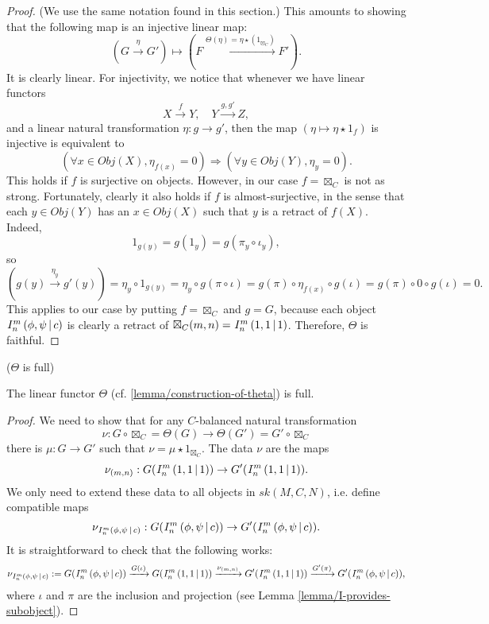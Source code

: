 \begin{proof}
  (We use the same notation found in this section.) This amounts to showing
  that the following map is an injective linear map:
  \[
    (G \xrightarrow{\eta} G') \mapsto (F \xrightarrow{\Theta(\eta) = \eta \star (1_{\boxtimes_{C}})} F').
  \]
  It is clearly linear. For injectivity, we notice that whenever we have
  linear functors
  \[
    X \xrightarrow{f} Y,\quad Y \xrightarrow{g, g'} Z,
  \]
  and a linear natural transformation $\eta: g \to g'$, then the map $(\eta \mapsto \eta \star 1_{f})$ is injective is equivalent to
  \[
    (\forall x \in Obj(X), \eta_{f(x)} = 0) \Rightarrow (\forall y \in Obj(Y), \eta_{y} = 0).
  \]
  This holds if $f$ is surjective on objects. However, in our case
  $f = \boxtimes_{C}$ is not as strong. Fortunately, clearly it also holds if
  $f$ is almost-surjective, in the sense that each $y \in Obj(Y)$ has an
  $x \in Obj(X)$ such that $y$ is a retract of $f(X)$. Indeed,
  \[
    1_{g(y)} = g(1_{y}) = g(\pi_{y} \circ \iota_{y}),
  \]
  so
  \[
    (g(y) \xrightarrow{\eta_{y}} g'(y)) = \eta_{y} \circ 1_{g(y)} = \eta_{y} \circ g(\pi \circ \iota) = g(\pi) \circ \eta_{f(x)} \circ g(\iota) = g(\pi) \circ 0 \circ g(\iota) = 0.
  \]
  This applies to our case by putting $f = \boxtimes_{C}$ and $g = G$, because
  each object ${}^{}_{} I^{m}_{n} \left( \phi, \psi \,\middle|\, c \right)$ is clearly a retract of
  $\boxtimes_{C}(m,n) = {}^{}_{} I^{m}_{n} \left( 1, 1 \,\middle|\, 1 \right)$. Therefore, $\Theta$ is faithful.
\end{proof}

\begin{lemma}\label{lemma/theta-is-full} ($\Theta$ is full)

  \noindent The linear functor $\Theta$ (cf. \ref{lemma/construction-of-theta}) is full.
\end{lemma}

\begin{proof}
  We need to show that for any $C$-balanced natural transformation
  \[
    \nu: G \circ \boxtimes_{C} = \Theta(G) \to \Theta(G') = G' \circ \boxtimes_{C}
  \]
  there is $\mu: G \to G'$ such that $\nu = \mu \star 1_{\boxtimes_{C}}$. The data $\nu$ are the maps
  \[
    \nu_{(m,n)}: G({}^{}_{} I^{m}_{n} \left( 1, 1 \,\middle|\, 1 \right)) \to G'({}^{}_{} I^{m}_{n} \left( 1, 1 \,\middle|\, 1 \right)).
  \]
  We only need to extend these data to all objects in $sk(M,C,N)$, i.e. define compatible maps
  \[
    \nu_{{}^{}_{} I^{m}_{n} \left( \phi, \psi \,\middle|\, c \right)}: G({}^{}_{} I^{m}_{n} \left( \phi, \psi \,\middle|\, c \right)) \to G'({}^{}_{} I^{m}_{n} \left( \phi, \psi \,\middle|\, c \right)).
  \]
  It is straightforward to check that the following works:
  \[
    \nu_{{}^{}_{} I^{m}_{n} \left( \phi, \psi \,\middle|\, c \right)}:= G({}^{}_{} I^{m}_{n} \left( \phi, \psi \,\middle|\, c \right))
    \xrightarrow{G(\iota)}
    G({}^{}_{} I^{m}_{n} \left( 1, 1 \,\middle|\, 1 \right))
    \xrightarrow{\nu_{(m,n)}}
    G'({}^{}_{} I^{m}_{n} \left( 1, 1 \,\middle|\, 1 \right))
    \xrightarrow{G'(\pi)}
    G'({}^{}_{} I^{m}_{n} \left( \phi, \psi \,\middle|\, c \right)),
  \]
  where $\iota$ and $\pi$ are the inclusion and projection (see
  Lemma \ref{lemma/I-provides-subobject}).
\end{proof}

